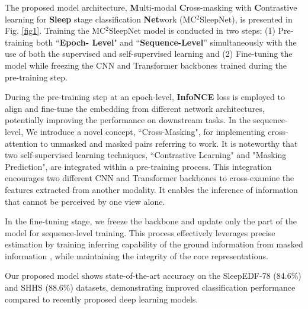 The proposed model architecture, {\bf M}ulti-modal {\bf C}ross-masking with {\bf C}ontrastive learning for {\bf Sleep} stage classification {\bf Net}work (MC$^2$SleepNet), is presented in Fig. \ref{fig1}. 
Training the MC$^2$SleepNet model is conducted in two steps: (1) Pre-training both ``{\bf Epoch- Level}" and  ``{\bf Sequence-Level}'' simultaneously with the use of both the supervised and self-supervised learning and (2) Fine-tuning the model while freezing the CNN and Transformer backbones trained during the pre-training step. 


During the pre-training step at an epoch-level, {\bf InfoNCE} loss \cite{oord2019representation} is employed to align and fine-tune the embedding from different network architectures, potentially improving the performance on downstream tasks. %
In the sequence-level, We introduce a novel concept, ``Cross-Masking", for implementing cross-attention to unmasked and masked pairs referring to \cite{NIPS2014_ImprovedMM} work.
%
It is noteworthy that two self-supervised learning techniques, ``Contrastive Learning" and "Masking Prediction", are integrated within a pre-training process. 
%
This integration encourages two different CNN and Transformer backbones to cross-examine the features extracted from another modality. It enables the inference of information that cannot be perceived by one view alone. %

In the fine-tuning stage, we freeze the backbone and update only the part of the model for sequence-level training. 
%
This process effectively leverages precise estimation by training inferring capability of the ground information from masked information \cite{NIPS2013_bengio}, while maintaining the integrity of the core representations.

Our proposed model shows state-of-the-art accuracy on the SleepEDF-78 (84.6\%) and SHHS (88.6\%) datasets, demonstrating improved classification performance compared to recently proposed deep learning models.

